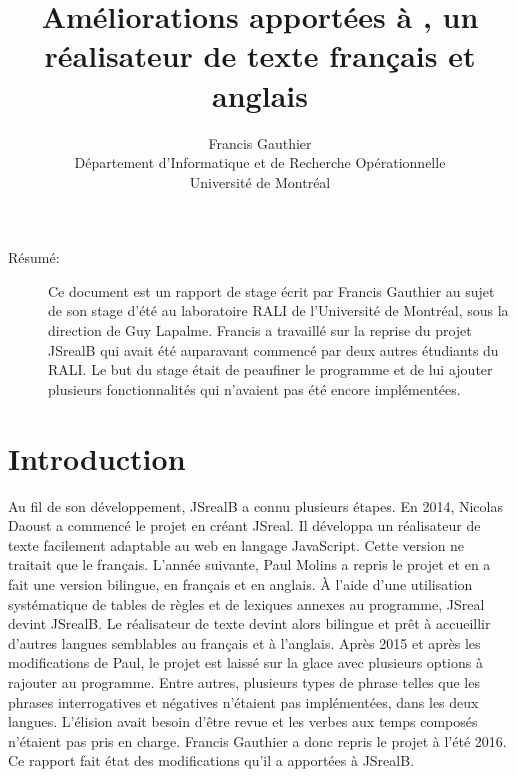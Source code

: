 \documentclass[11pt]{article} %
\title{Améliorations apportées à \JSB{}, un réalisateur de texte français et anglais}
\author{Francis Gauthier\\Département d'Informatique et de Recherche Opérationnelle\\Université de Montréal}
\newcommand{\system}[1]{\textsf{#1}}
\newcommand{\JSB}{\system{JSrealB}}
\begin{document}
\maketitle


\begin{description}
\item [{Résumé:}] Ce document est un rapport de stage écrit par Francis
Gauthier au sujet de son stage d'été au laboratoire RALI de l'Université
de Montréal, sous la direction de Guy Lapalme. Francis a travaillé sur
la reprise du projet \JSB{} qui avait été auparavant commencé par
deux autres étudiants du RALI. Le but du stage était de peaufiner
le programme et de lui ajouter plusieurs fonctionnalités qui n'avaient
pas été encore implémentées. 
\end{description}



\pagebreak
\begin{verse}
\tableofcontents{}
\end{verse}
\pagebreak


\section{Introduction}

Au fil de son développement, \JSB{} a connu plusieurs étapes. En
2014, Nicolas Daoust a commencé le projet en créant \system{JSreal}\cite{nicRapport}. Il développa
un réalisateur de texte facilement adaptable au web en langage JavaScript.
Cette version ne traitait que le français. L'année suivante, Paul Molins 
a repris le projet et en a fait une version bilingue, en français
et en anglais\cite{paulRapport}. À l'aide d'une utilisation systématique de tables de
règles et de lexiques annexes au programme, \system{JSreal} devint \JSB{}.
Le réalisateur de texte devint alors bilingue et prêt à accueillir
d'autres langues semblables au français et à l'anglais. Après 2015
et après les modifications de Paul, le projet est laissé sur la glace
avec plusieurs options à rajouter au programme. Entre autres, plusieurs
types de phrase telles que les phrases interrogatives et négatives
n'étaient pas implémentées, dans les deux langues. L'élision avait
besoin d'être revue et les verbes aux temps composés n'étaient pas
pris en charge. Francis Gauthier a donc repris le projet
à l'été 2016. Ce rapport fait état des modifications qu'il a apportées
à \JSB{}.
\end{document}
